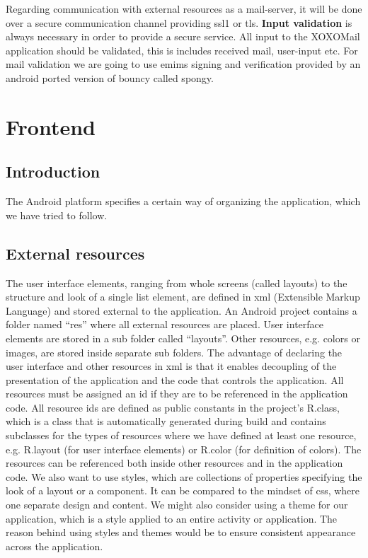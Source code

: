 Regarding communication with external resources as a mail-server, it will be done over a secure communication channel providing \gls{ssl1} or \gls{tls}. 
\newline
\newline
\textbf{Input validation} is always necessary in order to provide a secure service. All input to the XOXOMail application should be validated, this is includes received mail, user-input etc. For mail validation we are going to use \gls{emims} signing and verification provided by an android ported version of \gls{bouncy} called \gls{spongy}.

\section{Frontend}

\subsection{Introduction}
The Android platform specifies a certain way of organizing the application, which we have tried to follow.

\subsection{External resources}
The user interface elements, ranging from whole screens (called layouts) to the structure and look of a single list element, are defined in \gls{xml} (Extensible Markup Language) and stored external to the application. An Android project contains a folder named “res” where all external resources are placed. User interface elements are stored in a sub folder called “layouts”. Other resources, e.g. colors or images, are stored inside separate sub folders. The advantage of declaring the user interface and other resources in \gls{xml} is that it enables decoupling of the presentation of the application and the code that controls the application.
\newline
\newline
All resources must be assigned an \gls{id} if they are to be referenced in the application code. All resource \gls{id}s are defined as public constants in the project's R.class, which is a class that is automatically generated during build and contains subclasses for the types of resources where we have defined at least one resource, e.g. R.layout (for user interface elements) or R.color (for definition of colors). The resources can be referenced both inside other resources and in the application code.
\newline
\newline
We also want to use styles, which are collections of properties specifying the look of a layout or a component. It can be compared to the mindset of \gls{css}, where one separate design and content. We might also consider using a theme for our application, which is a style applied to an entire activity or application. The reason behind using styles and themes would be to ensure consistent appearance across the application. 

